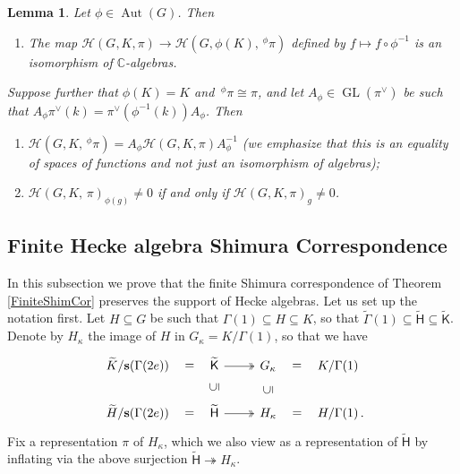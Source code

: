 \documentclass[10pt, letterpaper]{amsart}
\theoremstyle{plain}
\newtheorem{Lem}[equation]{Lemma}
\theoremstyle{definition}
\numberwithin{equation}{section}
\newcommand{\GL}{\operatorname{GL}}
\newcommand{\Ht}{\widetilde{H}}
\newcommand{\Kt}{\widetilde{K}}
\newcommand{\Gammaft}{\widetilde{\mathsf{\Gamma}}}
\newcommand{\Aut}{\operatorname{Aut}}
\newcommand{\s}{\mathbf{s}}
\newcommand{\Hcal}{\mathcal{H}}
\newcommand{\Hft}{\widetilde{\mathsf{H}}}
\newcommand{\Kft}{\widetilde{\mathsf{K}}}
\begin{document}
\begin{Lem}\label{L:HeckeAutTwist}
	Let $\phi\in\Aut(G)$. Then
	\begin{enumerate}
		\item[(1)] The map $\Hcal(G,K,\pi)\rightarrow \Hcal(G,\phi(K),\,^{\phi}\pi)$ defined by $f\mapsto f\circ\phi^{-1}$ is an isomorphism of $\mathbb{C}$-algebras.\label{HeckeAutTwist}
    \end{enumerate}
	Suppose further that $\phi(K)=K$ and $\,^{\phi}\pi\cong \pi$, and let $A_{\phi}\in \GL(\pi^\vee)$ be such that $A_{\phi}\pi^\vee(k)=\pi^\vee(\phi^{-1}(k))A_{\phi}$. Then
    \begin{enumerate}
		\item[(2)]  $\Hcal(G,K,\,^{\phi}\pi)=A_{\phi}\Hcal(G,K,\pi)A_{\phi}^{-1}$ (we emphasize that this is an equality of spaces of functions and not just an isomorphism of algebras);\label{HeckeEqual}
		\item[(3)] $\Hcal(G,K,\,\pi)_{\phi(g)}\neq 0$ if and only if $\Hcal(G,K,\pi)_{g}\neq 0$. \label{HeckeSuppRel}
	\end{enumerate}	
\end{Lem}




\subsection{Finite Hecke algebra Shimura Correspondence}\label{FinShimHecke}


In this subsection we prove that the finite Shimura correspondence of Theorem \ref{FiniteShimCor} preserves the support of Hecke algebras. Let us set up the notation first. Let $H\subseteq G$ be such that $\Gamma(1)\subseteq H\subseteq K$, so that $\Gammaft(1)\subseteq \Hft \subseteq \Kft$. Denote by $H_\kappa$ the image of $H$ in $G_{\kappa}=K\slash\Gamma(1)$, so that we have
    \[
    \begin{tikzcd}
        \Kt\slash \s(\Gamma(2e))\ar[r,phantom, "{=}"]&\Kft\ar[r, two heads]&G_\kappa \ar[r, phantom, "{=}"]&K\slash\Gamma(1)\\
        \Ht\slash \s(\Gamma(2e))\ar[r,phantom, "{=}"]&\Hft\ar[r, two heads]\ar[u,phantom, "{\subseteq}" sloped, description] &H_\kappa \ar[r, phantom, "{=}"]\ar[u,phantom, "{\subseteq}" sloped, description]&H\slash\Gamma(1) \rlap{\,.}
    \end{tikzcd}
    \]
Fix a representation $\pi$ of $H_\kappa$, which we also view as a representation of $\Hft$ by inflating via the above surjection $\Hft\twoheadrightarrow H_{\kappa}$.
\end{document}
